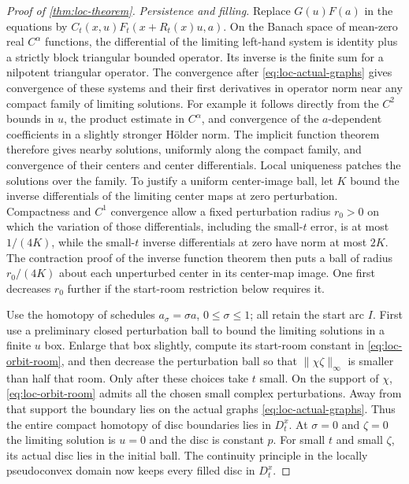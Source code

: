 \begin{proof}[Proof of \cref{thm:loc-theorem}]
\emph{Persistence and filling.} Replace $G(u)F(a)$ in the equations by $C_t(x,u)F_t(x+R_t(x)u,a)$.  On the Banach space of mean-zero real $C^\alpha$ functions, the differential of the limiting left-hand system is identity plus a strictly block triangular bounded operator. Its inverse is the finite sum for a nilpotent triangular operator. The convergence after \eqref{eq:loc-actual-graphs} gives convergence of these systems and their first derivatives in operator norm near any compact family of limiting solutions.  For example it follows directly from the $C^2$ bounds in $u$, the product estimate in $C^\alpha$, and convergence of the $a$-dependent coefficients in a slightly stronger H\"older norm.  The implicit function theorem therefore gives nearby solutions, uniformly along the compact family, and convergence of their centers and center differentials. Local uniqueness patches the solutions over the family.  To justify a uniform center-image ball, let $K$ bound the inverse differentials of the limiting center maps at zero perturbation.  Compactness and $C^1$ convergence allow a fixed perturbation radius $r_0>0$ on which the variation of those differentials, including the small-$t$ error, is at most $1/(4K)$, while the small-$t$ inverse differentials at zero have norm at most $2K$.  The contraction proof of the inverse function theorem then puts a ball of radius $r_0/(4K)$ about each unperturbed center in its center-map image.  One first decreases $r_0$ further if the start-room restriction below requires it.

Use the homotopy of schedules $a_\sigma=\sigma a$, $0\leq\sigma\leq1$; all retain the start arc $I$.  First use a preliminary closed perturbation ball to bound the limiting solutions in a finite $u$ box. Enlarge that box slightly, compute its start-room constant in \eqref{eq:loc-orbit-room}, and then decrease the perturbation ball so that $\|\chi\zeta\|_\infty$ is smaller than half that room.  Only after these choices take $t$ small. On the support of $\chi$, \eqref{eq:loc-orbit-room} admits all the chosen small complex perturbations.  Away from that support the boundary lies on the actual graphs \eqref{eq:loc-actual-graphs}.  Thus the entire compact homotopy of disc boundaries lies in $D_t^x$.  At $\sigma=0$ and $\zeta=0$ the limiting solution is $u=0$ and the disc is constant $p$.  For small $t$ and small $\zeta$, its actual disc lies in the initial ball.  The continuity principle in the locally pseudoconvex domain now keeps every filled disc in $D_t^x$.


\end{proof}
